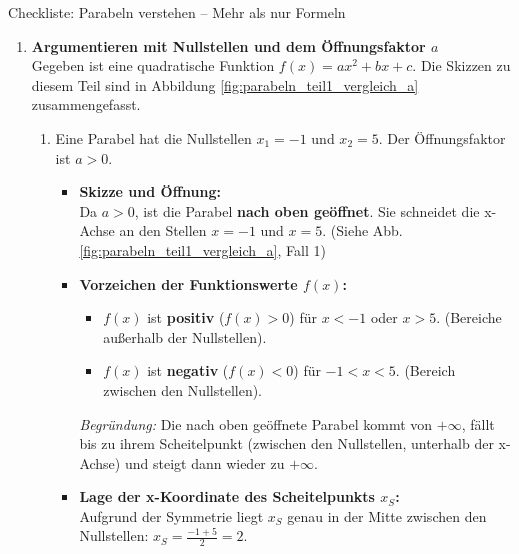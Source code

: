 \begin{loesungsumgebung}{Checkliste: Parabeln verstehen – Mehr als nur Formeln}

\begin{enumerate}[label=\textbf{Teil \arabic*:}]
    \item \textbf{Argumentieren mit Nullstellen und dem Öffnungsfaktor $a$} \\
    Gegeben ist eine quadratische Funktion $f(x)=ax^2+bx+c$.
    Die Skizzen zu diesem Teil sind in Abbildung \ref{fig:parabeln_teil1_vergleich_a} zusammengefasst.

    \begin{enumerate}[label=(\alph*)]
        \item Eine Parabel hat die Nullstellen $x_1 = -1$ und $x_2 = 5$. Der Öffnungsfaktor ist $a > 0$.
        \begin{itemize}
            \item \textbf{Skizze und Öffnung:} \\
            Da $a > 0$, ist die Parabel \textbf{nach oben geöffnet}. Sie schneidet die x-Achse an den Stellen $x=-1$ und $x=5$. (Siehe Abb. \ref{fig:parabeln_teil1_vergleich_a}, Fall 1)

            \item \textbf{Vorzeichen der Funktionswerte $f(x)$:}
            \begin{itemize}
                \item $f(x)$ ist \textbf{positiv} ($f(x)>0$) für $x < -1$ oder $x > 5$. (Bereiche außerhalb der Nullstellen).
                \item $f(x)$ ist \textbf{negativ} ($f(x)<0$) für $-1 < x < 5$. (Bereich zwischen den Nullstellen).
            \end{itemize}
            \textit{Begründung:} Die nach oben geöffnete Parabel kommt von $+\infty$, fällt bis zu ihrem Scheitelpunkt (zwischen den Nullstellen, unterhalb der x-Achse) und steigt dann wieder zu $+\infty$.

            \item \textbf{Lage der x-Koordinate des Scheitelpunkts $x_S$:} \\
            Aufgrund der Symmetrie liegt $x_S$ genau in der Mitte zwischen den Nullstellen:
            $ x_S = \frac{-1 + 5}{2} = 2 $.
        \end{itemize}


\end{enumerate}
\end{enumerate}
\end{loesungsumgebung}
